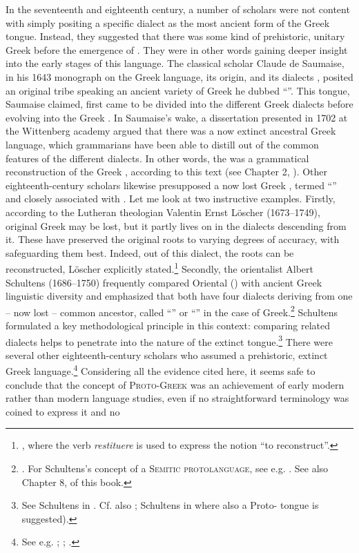 In the seventeenth and eighteenth century, a number of scholars were not content with simply positing a specific dialect as the most ancient form of the Greek tongue. Instead, they suggested that there was some kind of prehistoric, unitary Greek before the emergence of . They were in other words gaining deeper insight into the early stages of this language. The  classical scholar Claude de Saumaise, in his 1643 monograph on the Greek language, its origin, and its dialects \citep{Saumaise1643a}, posited an original  tribe speaking an ancient variety of Greek he dubbed “”. This tongue, Saumaise claimed, first came to be divided into the different Greek dialects before evolving into the Greek . In Saumaise’s wake, a dissertation presented in 1702 at the Wittenberg academy argued that there was a now extinct ancestral Greek language, which grammarians have been able to distill out of the common features of the different dialects. In other words, the  was a grammatical reconstruction of the Greek , according to this text (see Chapter 2, ). Other eighteenth-century scholars likewise presupposed a now lost Greek , termed “” and closely associated with . Let me look at two instructive examples. Firstly, according to the Lutheran theologian Valentin Ernst Löscher (1673–1749), original  Greek may be lost, but it partly lives on in the dialects descending from it. These have preserved the original  roots to varying degrees of accuracy, with  safeguarding them best. Indeed, out of this dialect, the roots can be reconstructed, Löscher explicitly stated.\footnote{\citet[24–25, 84–85]{Loscher1705}, where the  verb \textit{restituere} is used to express the notion “to reconstruct”.} Secondly, the  orientalist Albert Schultens (1686–1750) frequently compared Oriental () with ancient Greek linguistic diversity and emphasized that both have four dialects deriving from one – now lost – common ancestor, called “” or “” in the case of Greek.\footnote{\citet[\textsc{lxxv–lxxvi,} \textsc{xcii–xciv,} \textsc{civ}]{Schultens1748}. For Schultens’s concept of a \textsc{Semitic} \textsc{protolanguage}, see e.g. \citet[esp. 84--86]{Eskhult2015}. See also Chapter 8,  of this book.} Schultens formulated a key methodological principle in this context: comparing related dialects helps to penetrate into the nature of the extinct tongue.\footnote{See Schultens in \citet[§§\textsc{cxv–cxx}]{Eskhult_albert_nodate}. Cf. also \citet[19--20]{Schultens1738a}; Schultens in \citet[§§\textsc{xc–xcii}]{Eskhult_albert_nodate} where also a Proto- tongue is suggested).} There were several other eighteenth-century scholars who assumed a prehistoric, extinct Greek language.\footnote{See e.g. \citet[1--2]{Munthe1748}; \citet[104--106]{Hemsterhuis2015}; \citet[15]{Wise1758}.} Considering all the evidence cited here, it seems safe to conclude that the concept of \textsc{Proto-Greek} was an achievement of early modern rather than modern language studies, even if no straightforward terminology was coined to express it and no 